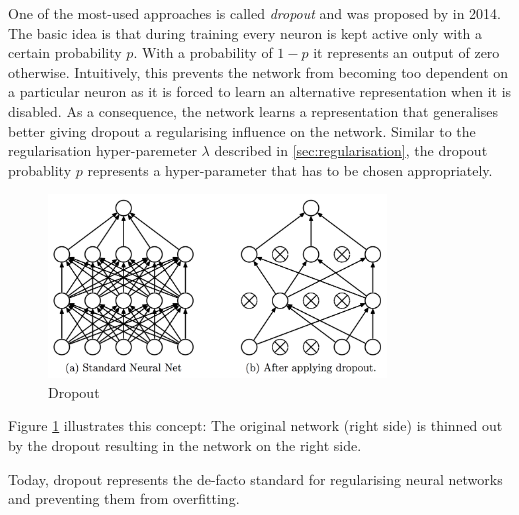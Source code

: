 One of the most-used approaches is called \emph{dropout} and was proposed by %
in 2014. The basic idea is that during training every neuron is kept active only with a certain probability $p$. With a probability of $1-p$ it represents an output of zero otherwise. Intuitively, this prevents the network from becoming too dependent on a particular neuron as it is forced to learn an alternative representation when it is disabled. As a consequence, the network learns a representation that generalises better giving dropout a regularising influence on the network. Similar to the regularisation hyper-paremeter $\lambda$ described in \ref{sec:regularisation}, the dropout probablity $p$ represents a hyper-parameter that has to be chosen appropriately.
\begin{figure}[h]
	\centering
	\includegraphics[width=0.8\textwidth]{figures/chapter-2/dropout.png}
		\caption{Dropout}\label{fig:dropout}
\end{figure}




Figure \ref{fig:dropout} illustrates this concept: The original network (right side) is thinned out by the dropout resulting in the network on the right side. 

Today, dropout represents the de-facto standard for regularising neural networks and preventing them from overfitting. 


